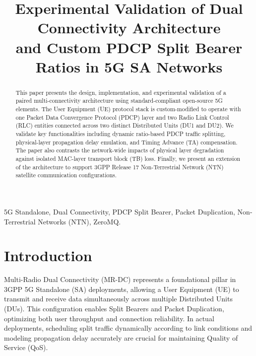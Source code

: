 \documentclass[conference]{IEEEtran}
\begin{document}
\title{Experimental Validation of Dual Connectivity Architecture \\ and Custom PDCP Split Bearer Ratios in 5G SA Networks}

\author{
}

\maketitle

\begin{abstract}
This paper presents the design, implementation, and experimental validation of a paired multi-connectivity architecture using standard-compliant open-source 5G elements. The User Equipment (UE) protocol stack is custom-modified to operate with one Packet Data Convergence Protocol (PDCP) layer and two Radio Link Control (RLC) entities connected across two distinct Distributed Units (DU1 and DU2). We validate key functionalities including dynamic ratio-based PDCP traffic splitting, physical-layer propagation delay emulation, and Timing Advance (TA) compensation. The paper also contrasts the network-wide impacts of physical layer degradation against isolated MAC-layer transport block (TB) loss. Finally, we present an extension of the architecture to support 3GPP Release 17 Non-Terrestrial Network (NTN) satellite communication configurations.
\end{abstract}

\begin{IEEEkeywords}
5G Standalone, Dual Connectivity, PDCP Split Bearer, Packet Duplication, Non-Terrestrial Networks (NTN), ZeroMQ.
\end{IEEEkeywords}

\section{Introduction}
Multi-Radio Dual Connectivity (MR-DC) represents a foundational pillar in 3GPP 5G Standalone (SA) deployments, allowing a User Equipment (UE) to transmit and receive data simultaneously across multiple Distributed Units (DUs). This configuration enables Split Bearers and Packet Duplication, optimizing both user throughput and connection reliability. In actual deployments, scheduling split traffic dynamically according to link conditions and modeling propagation delay accurately are crucial for maintaining Quality of Service (QoS).
\end{document}
